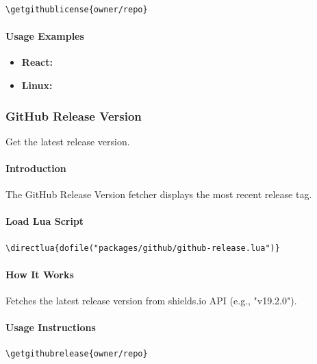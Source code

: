 \documentclass{article}
\begin{document}
\begin{verbatim}
\getgithublicense{owner/repo}
\end{verbatim}

\paragraph{Usage Examples}

\begin{itemize}
    \item \textbf{React:} 
    \item \textbf{Linux:} 
\end{itemize}

\subsubsection{GitHub Release Version}

Get the latest release version.

\paragraph{Introduction}

The GitHub Release Version fetcher displays the most recent release tag.

\paragraph{Load Lua Script}

\begin{verbatim}
\directlua{dofile("packages/github/github-release.lua")}
\end{verbatim}

\paragraph{How It Works}

Fetches the latest release version from shields.io API (e.g., "v19.2.0").

\paragraph{Usage Instructions}

\begin{verbatim}
\getgithubrelease{owner/repo}
\end{verbatim}
\end{document}
